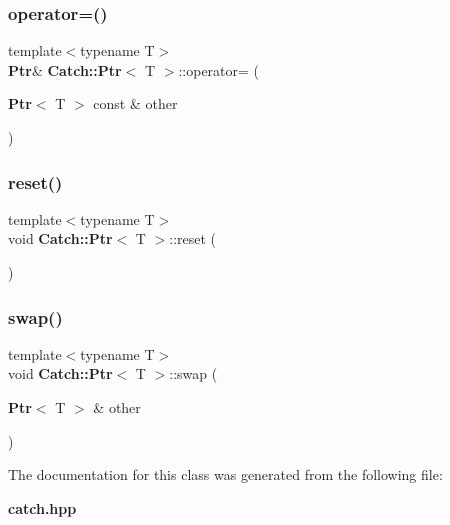 \subsubsection{operator=()\hspace{0.1cm}{\footnotesize\ttfamily [2/2]}}
{\footnotesize\ttfamily template$<$typename T$>$ \\
\textbf{ Ptr}\& \textbf{ Catch\+::\+Ptr}$<$ T $>$\+::operator= (\begin{DoxyParamCaption}\item[{\textbf{ Ptr}$<$ T $>$ const \&}]{other }\end{DoxyParamCaption})\hspace{0.3cm}{\ttfamily [inline]}}

\mbox{\label{class_catch_1_1_ptr_af8d0fa7a2cd20842830b354ac31dfe5c}} 
\subsubsection{reset()}
{\footnotesize\ttfamily template$<$typename T$>$ \\
void \textbf{ Catch\+::\+Ptr}$<$ T $>$\+::reset (\begin{DoxyParamCaption}{ }\end{DoxyParamCaption})\hspace{0.3cm}{\ttfamily [inline]}}

\mbox{\label{class_catch_1_1_ptr_a172bf8b4e71e26a5a4d92f5b02158b50}} 
\subsubsection{swap()}
{\footnotesize\ttfamily template$<$typename T$>$ \\
void \textbf{ Catch\+::\+Ptr}$<$ T $>$\+::swap (\begin{DoxyParamCaption}\item[{\textbf{ Ptr}$<$ T $>$ \&}]{other }\end{DoxyParamCaption})\hspace{0.3cm}{\ttfamily [inline]}}



The documentation for this class was generated from the following file\+:\begin{DoxyCompactItemize}
\item 
\textbf{ catch.\+hpp}\end{DoxyCompactItemize}
